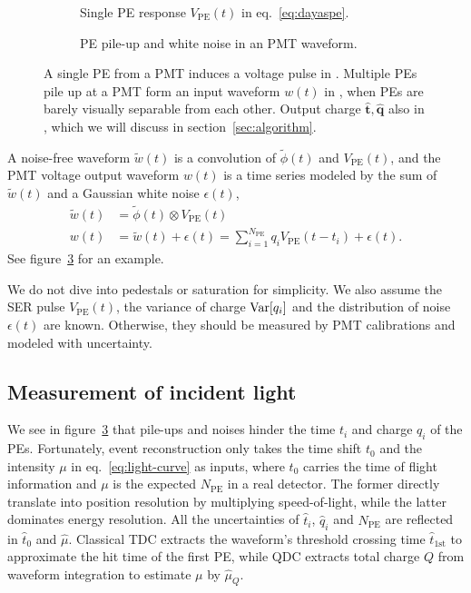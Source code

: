 \begin{figure}[H]
  \begin{subfigure}{.49\textwidth}
    \centering
    \resizebox{\textwidth}{!}{}
    \caption{\label{fig:spe} Single PE response $V_\mathrm{PE}(t)$ in eq.~\eqref{eq:dayaspe}.}
  \end{subfigure}
  \begin{subfigure}{.49\textwidth}
    \centering
    \resizebox{\textwidth}{!}{}
    \caption{\label{fig:pile} PE pile-up and white noise in an PMT waveform.}
  \end{subfigure}
  \caption{A single PE from a PMT induces a voltage pulse in . Multiple PEs pile up at a PMT form an input waveform $w(t)$ in , when PEs are barely visually separable from each other. Output charge $\hat{\bm{t}}, \hat{\bm{q}}$ also in , which we will discuss in section~\ref{sec:algorithm}. }
\end{figure}

A noise-free waveform $\tilde{w}(t)$ is a convolution of $\tilde{\phi}(t)$ and $V_\mathrm{PE}(t)$, and the PMT voltage output waveform $w(t)$ is a time series modeled by the sum of $\tilde{w}(t)$ and a Gaussian white noise $\epsilon(t)$,
\begin{equation}
  \label{eq:1}
  \begin{aligned}
    \tilde{w}(t) &= \tilde{\phi}(t) \otimes V_\mathrm{PE}(t) \\
    w(t) &= \tilde{w}(t) + \epsilon(t) = \sum_{i=1}^{N_\mathrm{PE}} q_i V_\mathrm{PE}(t-t_i) + \epsilon(t).
  \end{aligned}
\end{equation}
See figure~\ref{fig:pile} for an example.

We do not dive into pedestals or saturation for simplicity.  We also assume the SER pulse $V_\mathrm{PE}(t)$, the variance of charge $\operatorname{Var}[q_i]$ and the distribution of noise $\epsilon(t)$ are known.  Otherwise, they should be measured by PMT calibrations and modeled with uncertainty.


\subsection{Measurement of incident light}
\label{sec:time}
We see in figure~\ref{fig:pile} that pile-ups and noises hinder the time $t_i$ and charge $q_i$ of the PEs. Fortunately, event reconstruction only takes the time shift $t_0$ and the intensity $\mu$ in eq.~\eqref{eq:light-curve} as inputs, where $t_0$ carries the time of flight information and $\mu$ is the expected $N_\mathrm{PE}$ in a real detector. The former directly translate into position resolution by multiplying speed-of-light, while the latter dominates energy resolution.  All the uncertainties of $\hat{t}_i$, $\hat{q}_i$ and $\hat{N}_\mathrm{PE}$ are reflected in $\hat{t}_0$ and $\hat{\mu}$. Classical TDC extracts the waveform's threshold crossing time $\hat{t}_\mathrm{1st}$ to approximate the hit time of the first PE, while QDC extracts total charge $Q$ from waveform integration to estimate $\mu$ by $\hat{\mu}_Q$.

